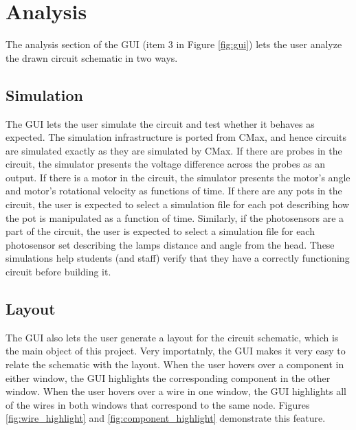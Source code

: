 \section{Analysis}

The analysis section of the GUI (item $3$ in Figure \ref{fig:gui}) lets the user
analyze the drawn circuit schematic in two ways.

\subsection{Simulation}

The GUI lets the user simulate the circuit and test whether it behaves as
expected. The simulation infrastructure is ported from CMax, and hence circuits
are simulated exactly as they are simulated by CMax. If there are probes in the
circuit, the simulator presents the voltage difference across the probes as an
output. If there is a motor in the circuit, the simulator presents the motor's
angle and motor's rotational velocity as functions of time. If there are any
pots in the circuit, the user is expected to select a simulation file for each
pot describing how the pot is manipulated as a function of time. Similarly,
if the photosensors are a part of the circuit, the user is expected to select
a simulation file for each photosensor set describing the lamps distance and
angle from the head. These simulations help students (and staff) verify that
they have a correctly functioning circuit before building it.

\subsection{Layout}

The GUI also lets the user generate a layout for the circuit schematic, which is
the main object of this project. Very importatnly, the GUI makes it very easy to
relate the schematic with the layout. When the user hovers over a component in
either window, the GUI highlights the corresponding component in the other
window. When the user hovers over a wire in one window, the GUI highlights all
of the wires in both windows that correspond to the same node. Figures
\ref{fig:wire_highlight} and \ref{fig:component_highlight} demonstrate this
feature.

